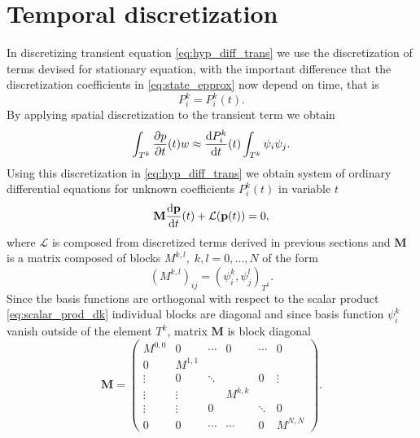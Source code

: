 \section{Temporal discretization}
\label{se:time_theory}
%
In discretizing transient equation \eqref{eq:hyp_diff_trans} we use the 
discretization of terms devised for stationary equation, with the important 
difference that the discretization coefficients in \eqref{eq:state_epprox} now 
depend on time, that is
\begin{equation}
    P^k_i = P^k_i(t).
\end{equation}
By applying spatial discretization to the transient term we obtain
\begin{equation}
    \int_{T^k}\frac{\partial p}{\partial t}(t)w \approx  \frac{\text{d}P^k_i}{\text{d}t}(t)\int_{T^k}\psi_i\psi_j. 
\end{equation}
Using this discretization in \eqref{eq:hyp_diff_trans} we obtain system of 
ordinary differential equations for unknown coefficients 
$P^k_i(t)$ in variable $t$
\begin{equation}\label{eq:time_diff}
    \mathbf{M}  \frac{\text{d}\mathbf{p}}{\text{d}t}(t) + \mathcal{L}(\mathbf{p}(t)) = 0,
\end{equation}
where $\mathcal{L}$  is composed from discretized terms  derived in previous 
sections and $\mathbf{M}$ is a matrix composed of blocks $M^{k,l},\; k,l=0, 
\ldots , N$ of the 
form
\begin{equation}
(M^{k,l})_{ij} = ( \psi^k_i,\psi^l_j)_{T^k}.
\end{equation}
Since the basis functions are orthogonal with respect to the scalar product 
\eqref{eq:scalar_prod_dk} individual blocks are diagonal and since basis 
function $\psi^k_i$ vanish outside of the element $T^k$, matrix $\mathbf{M}$ 
is block diagonal 
\begin{equation}
\mathbf{M}  = \begin{pmatrix}
        M^{0,0}      &    0   &\cdots&  0   &\cdots&0\\
        0         &   M^{1,1}  &      &      &      &\\
        \vdots     &    0   &\ddots&      &  0   &\vdots\\
      \vdots     & \vdots &      & M^{k,k}  &      &\\
        \vdots   & \vdots & 0    &      &\ddots&0\\
        0         &   0    &\cdots&\cdots&   0  &M^{N,N} 
    \end{pmatrix}.
\end{equation}
